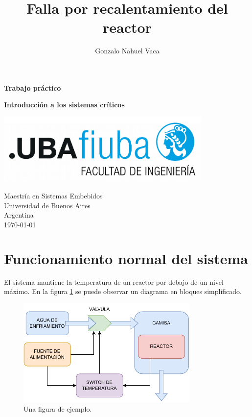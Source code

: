 \documentclass[
    11pt,
    spanish,
    a4paper
]{article}
\title{Falla por recalentamiento del reactor}
\author{Gonzalo Nahuel Vaca}
\def\doctype{Trabajo práctico}
\begin{document}
\makeatletter
\begin{titlepage}
	\begin{center}
		\vspace*{1cm}

		\Huge
		\textbf{\doctype}
		\vspace{0.5cm}

		\LARGE
		\@title
		\vspace{0.5cm}

		\textbf{Introducción a los sistemas críticos}

		\vspace{1.5cm}

		\textbf{\@author}

		\vspace{1.5cm}

		\includegraphics[width=0.8\textwidth]{img/logoFIUBA.pdf}

		\vfill
		Maestría en Sistemas Embebidos\\
		Universidad de Buenos Aires\\
		Argentina\\
		\today
	\end{center}
\end{titlepage}
\makeatother
\newpage

\section{Funcionamiento normal del sistema}

El sistema mantiene la temperatura de un reactor por debajo de un nivel máximo.
En la figura \ref{fig:reactor} se puede observar un diagrama en bloques simplificado.

\begin{figure}[htbp]
	\centering
	\includegraphics[width=0.8\textwidth]{img/reactor.pdf}
	\caption{Una figura de ejemplo.}
	\label{fig:reactor}
\end{figure}
\end{document}
